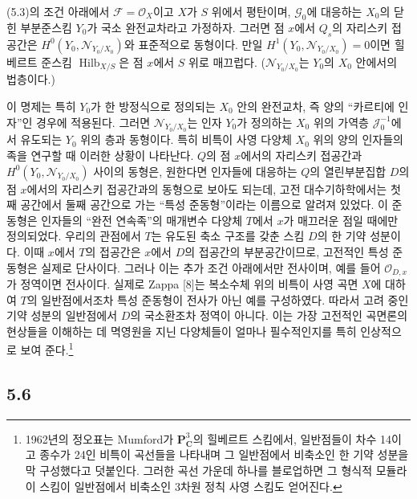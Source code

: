  (5.3)의 조건 아래에서
$\mathcal F=\mathcal O_X$이고 $X$가 $S$ 위에서 평탄이며,
$\mathcal G_0$에 대응하는 $X_0$의 닫힌 부분준스킴 $Y_0$가 국소
완전교차라고 가정하자. 그러면 점 $x$에서 $Q_s$의 자리스키 접공간은
$H^0(Y_0,\mathcal N_{Y_0/X_0})$와 표준적으로 동형이다. 만일
$H^1(Y_0,\mathcal N_{Y_0/X_0})=0$이면 힐베르트 준스킴
$\operatorname{Hilb}_{X/S}$은 점 $x$에서 $S$ 위로 매끄럽다.
($\mathcal N_{Y_0/X_0}$는 $Y_0$의 $X_0$ 안에서의 법층이다.)

 이 명제는 특히 $Y_0$가 한 방정식으로 정의되는
$X_0$ 안의 완전교차, 즉 양의 ``카르티에 인자''인 경우에 적용된다.
그러면 $\mathcal N_{Y_0/X_0}$는 인자 $Y_0$가 정의하는 $X_0$ 위의
가역층 $\mathcal J_0^{-1}$에서 유도되는 $Y_0$ 위의 층과 동형이다. 특히
비특이 사영 다양체 $X_0$ 위의 양의 인자들의 족을 연구할 때 이러한
상황이 나타난다. $Q$의 점 $x$에서의 자리스키 접공간과
$H^0(Y_0,\mathcal N_{Y_0/X_0})$ 사이의 동형은, 원한다면 인자들에
대응하는 $Q$의 열린부분집합 $D$의 점 $x$에서의 자리스키 접공간과의
동형으로 보아도 되는데, 고전 대수기하학에서는 첫째 공간에서 둘째
공간으로 가는 ``특성 준동형''이라는 이름으로 알려져 있었다. 이
준동형은 인자들의 ``완전 연속족''의 매개변수 다양체 $T$에서 $x$가
매끄러운 점일 때에만 정의되었다. 우리의 관점에서 $T$는 유도된 축소
구조를 갖춘 스킴 $D$의 한 기약 성분이다. 이때 $x$에서 $T$의 접공간은
$x$에서 $D$의 접공간의 부분공간이므로, 고전적인 특성 준동형은 실제로
단사이다. 그러나 이는 추가 조건 아래에서만 전사이며, 예를 들어
$\mathcal O_{D,x}$가 정역이면 전사이다. 실제로 Zappa [8]는
복소수체 위의 비특이 사영 곡면 $X$에 대하여 $T$의 일반점에서조차
특성 준동형이 전사가 아닌 예를 구성하였다. 따라서 고려 중인 기약
성분의 일반점에서 $D$의 국소환조차 정역이 아니다. 이는 가장 고전적인
곡면론의 현상들을 이해하는 데 멱영원을 지닌 다양체들이 얼마나
필수적인지를 특히 인상적으로 보여 준다.\footnote{1962년의 정오표는
Mumford가 $\mathbf P^3_{\mathbf C}$의 힐베르트 스킴에서, 일반점들이 차수
14이고 종수가 24인 비특이 곡선들을 나타내며 그 일반점에서 비축소인 한
기약 성분을 막 구성했다고 덧붙인다. 그러한 곡선 가운데 하나를
블로업하면 그 형식적 모듈라이 스킴이 일반점에서 비축소인 3차원 정칙
사영 스킴도 얻어진다.}

\subsection*{5.6}

